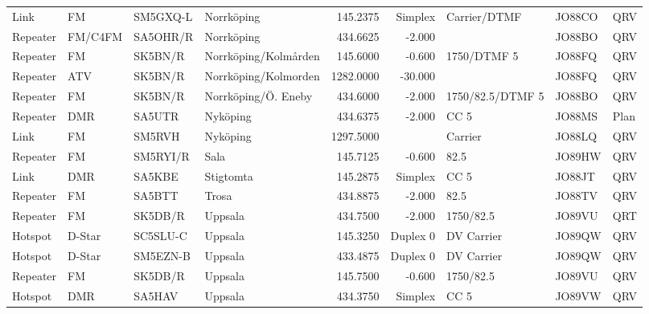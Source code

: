 \begin{landscape}
\begin{longtable}{llllrrlll}
	Link              & FM         & SM5GXQ-L & Norrköping           &     145.2375 &    Simplex & Carrier/DTMF      & JO88CO      & QRV      \\
	Repeater          & FM/C4FM    & SA5OHR/R & Norrköping           &     434.6625 &     -2.000 &                   & JO88BO      & QRV      \\
	Repeater          & FM         & SK5BN/R  & Norrköping/Kolmården &     145.6000 &     -0.600 & 1750/DTMF 5       & JO88FQ      & QRV      \\
	Repeater          & ATV        & SK5BN/R  & Norrköping/Kolmorden &    1282.0000 &    -30.000 &                   & JO88FQ      & QRV      \\
	Repeater          & FM         & SK5BN/R  & Norrköping/Ö. Eneby  &     434.6000 &     -2.000 & 1750/82.5/DTMF 5  & JO88BO      & QRV      \\
	Repeater          & DMR        & SA5UTR   & Nyköping             &     434.6375 &     -2.000 & CC 5              & JO88MS      & Plan     \\
	Link              & FM         & SM5RVH   & Nyköping             &    1297.5000 &            & Carrier           & JO88LQ      & QRV      \\
	Repeater          & FM         & SM5RYI/R & Sala                 &     145.7125 &     -0.600 & 82.5              & JO89HW      & QRV      \\
	Link              & DMR        & SA5KBE   & Stigtomta            &     145.2875 &    Simplex & CC 5              & JO88JT      & QRV      \\
	Repeater          & FM         & SA5BTT   & Trosa                &     434.8875 &     -2.000 & 82.5              & JO88TV      & QRV      \\
	Repeater          & FM         & SK5DB/R  & Uppsala              &     434.7500 &     -2.000 & 1750/82.5         & JO89VU      & QRT      \\
	Hotspot           & D-Star     & SC5SLU-C & Uppsala              &     145.3250 &   Duplex 0 & DV Carrier        & JO89QW      & QRV      \\
	Hotspot           & D-Star     & SM5EZN-B & Uppsala              &     433.4875 &   Duplex 0 & DV Carrier        & JO89QW      & QRV      \\
	Repeater          & FM         & SK5DB/R  & Uppsala              &     145.7500 &     -0.600 & 1750/82.5         & JO89VU      & QRV      \\
	Hotspot           & DMR        & SA5HAV   & Uppsala              &     434.3750 &    Simplex & CC 5              & JO89VW      & QRV      \\

\end{longtable}
\end{landscape}

